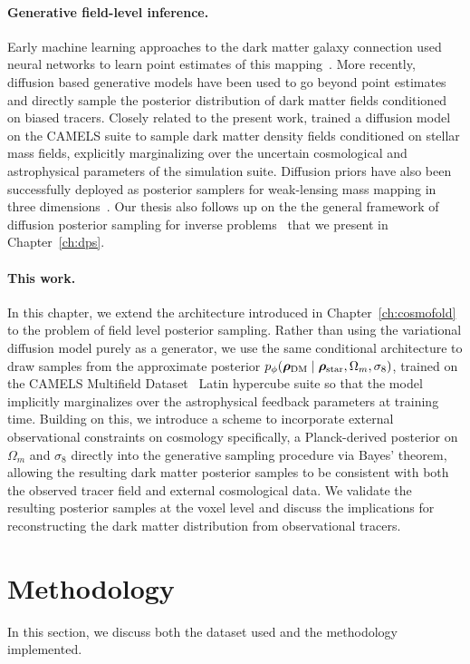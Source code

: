 \paragraph{Generative field-level inference.}
Early machine learning approaches to the dark matter galaxy connection used neural networks to learn point estimates of this
mapping~\citep{modi_cosmological_2018}. More recently, diffusion based generative models have been used to go beyond point estimates and directly sample the posterior distribution of dark matter fields conditioned on biased tracers. Closely related to the present work, \citet{ono_debiasing_2024} trained a diffusion model on the CAMELS suite to sample dark matter density fields conditioned on stellar mass fields, explicitly marginalizing over the uncertain cosmological and astrophysical parameters of the simulation suite. Diffusion priors have also been
successfully deployed as posterior samplers for weak-lensing mass mapping in three dimensions~\citep{zhao_generative_2026}. Our thesis also follows up on the the general framework of diffusion posterior sampling for inverse problems~\citep{chung_diffusion_2023} that we present in Chapter~\ref{ch:dps}.


\paragraph{This work.}
In this chapter, we extend the \FOLD architecture introduced in
Chapter~\ref{ch:cosmofold} to the problem of field level posterior sampling. Rather than using the variational diffusion model purely as a generator, we use the same conditional architecture to draw samples from the approximate
posterior $p_\phi(\boldsymbol{\rho}_\mathrm{DM} \mid \bm{\rho}_\text{star},
\Omega_m, \sigma_8)$, trained on the CAMELS Multifield
Dataset~\citep{villaescusa-navarro_camels_2022} Latin hypercube suite so that the model implicitly marginalizes over the astrophysical feedback parameters at training time. Building on this, we introduce a scheme to incorporate external observational constraints on cosmology specifically, a Planck-derived
posterior on $\Omega_m$ and $\sigma_8$ directly into the generative sampling procedure via Bayes' theorem, allowing the resulting dark matter posterior samples to be consistent with both the observed tracer field and external cosmological data. We validate the resulting posterior samples at the voxel level and discuss the implications for reconstructing the dark matter distribution from observational tracers.

\section{Methodology}
In this section, we discuss both the dataset used and the methodology implemented.
